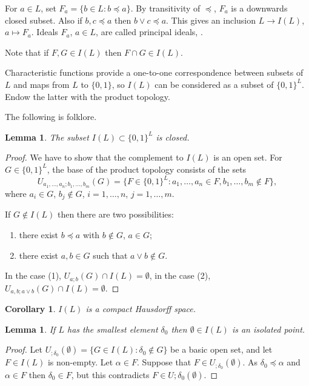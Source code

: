 \documentclass[reqno,12pt]{amsart}
\theoremstyle{plain}%
\newtheorem{lem}[thm]{Lemma}
\newtheorem{cor}[thm]{Corollary}
\theoremstyle{definition}
\theoremstyle{remark}
\numberwithin{equation}{section}
\begin{document}
For $a\in L$, set $F_a=\{b\in L:b\preceq a\}$. By transitivity of $\preceq$, $F_a$ is a downwards closed subset. Also if $b,c\preceq a$ then $b\lor c\preceq a$. This gives an inclusion $L\to I(L)$, $a\mapsto F_a$. Ideals $F_a$, $a\in L$, are called principal ideals, \cite{book}. 

Note that if $F,G\in I(L)$ then $F\cap G\in I(L)$.


Characteristic functions provide a one-to-one correspondence between subsets of $L$ and maps from $L$ to $\{0,1\}$, so $I(L)$ can be considered as a subset of $\{0,1\}^L$. Endow the latter with the product topology. 

The following is folklore.

\begin{lem}
The subset $I(L)\subset\{0,1\}^L$ is closed.

\end{lem}
\begin{proof}
We have to show that the complement to $I(L)$ is an open set. For $G\in \{0,1\}^L$, the base of the product topology consists of the sets 
$$
U_{a_1,\ldots,a_n;b_1,\ldots,b_m}(G)=\{F\in \{0,1\}^L: a_1,\ldots,a_n\in F,b_1,\ldots,b_m\notin F\},
$$ 
where $a_i\in G$, $b_j\notin G$, $i=1,\ldots,n$, $j=1,\ldots,m$.

If $G\notin I(L)$ then there are two possibilities: 
\begin{enumerate}
\item
there exist $b\preceq a$ with $b\notin G$, $a\in G$;
\item
there exist $a,b\in G$ such that $a\lor b\notin G$.
\end{enumerate}
In the case (1), $U_{a;b}(G)\cap I(L)=\emptyset$, in the case (2), $U_{a,b;a\lor b}(G)\cap I(L)=\emptyset$.
\end{proof} 

\begin{cor}
$I(L)$ is a compact Hausdorff space.

\end{cor}


\begin{lem}
If $L$ has the smallest element $\delta_0$ then $\emptyset\in I(L)$ is an isolated point.

\end{lem}
\begin{proof}
Let $U_{;\delta_0}(\emptyset)=\{G\in I(L):\delta_0\notin G\}$ be a basic open set, and let $F\in I(L)$ is non-empty. Let $\alpha\in F$. Suppose that $F\in U_{;\delta_0}(\emptyset)$. As $\delta_0\preceq\alpha$ and $\alpha\in F$ then $\delta_0\in F$, but this contradicts $F\in U{;\delta_0}(\emptyset)$.  
\end{proof}
\end{document}
